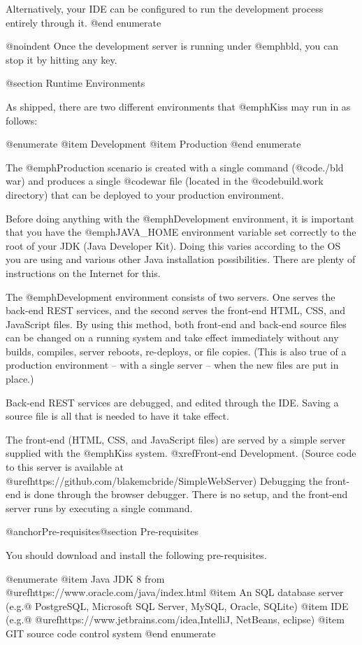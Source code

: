Alternatively, your IDE can be configured to run the development
process entirely through it.
@end enumerate

@noindent Once the development server is running under @emph{bld}, you can stop it 
by hitting any key.

@section Runtime Environments

As shipped, there are two different environments that @emph{Kiss} may
run in as follows:

@enumerate
@item
Development
@item 
Production
@end enumerate

The @emph{Production} scenario is created with a single command
(@code{./bld war}) and produces a single @code{war} file (located in
the @code{build.work} directory) that can be deployed to your production
environment.

Before doing anything with the @emph{Development} environment, it is
important that you have the @emph{JAVA_HOME} environment variable set
correctly to the root of your JDK (Java Developer Kit).  Doing this
varies according to the OS you are using and various other Java
installation possibilities.  There are plenty of instructions on the
Internet for this.

The @emph{Development} environment consists of two servers.  One
serves the back-end REST services, and the second serves the front-end
HTML, CSS, and JavaScript files.  By using this method, both front-end
and back-end source files can be changed on a running system and take
effect immediately without any builds, compiles, server reboots,
re-deploys, or file copies.  (This is also true of a production
environment -- with a single server -- when the new files are put in place.)

Back-end REST services are debugged, and edited through the IDE.
Saving a source file is all that is needed to have it take effect.

The front-end (HTML, CSS, and JavaScript files) are served by a simple
server supplied with the @emph{Kiss} system.  @xref{Front-end
Development}.  (Source code to this server is available at
@uref{https://github.com/blakemcbride/SimpleWebServer}) Debugging the
front-end is done through the browser debugger.  There is no setup,
and the front-end server runs by executing a single command.

@anchor{Pre-requisites}@section Pre-requisites

You should download and install the following pre-requisites.

@enumerate
@item
Java JDK 8 from @uref{https://www.oracle.com/java/index.html}
@item
An SQL database server (e.g.@ PostgreSQL, Microsoft SQL Server, MySQL,
Oracle, SQLite)
@item
IDE (e.g.@ @uref{https://www.jetbrains.com/idea,IntelliJ}, NetBeans, eclipse)
@item
GIT source code control system
@end enumerate

